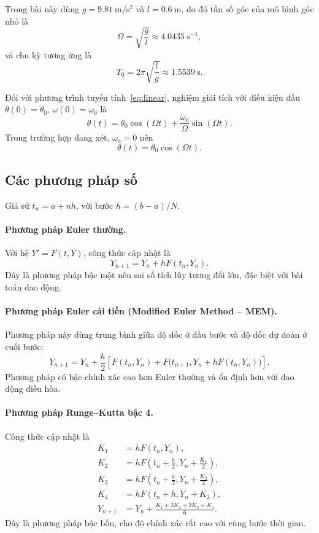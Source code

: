 \documentclass{article}
\begin{document}
Trong bài này dùng $g = 9.81\ \mathrm{m/s^2}$ và $l = 0.6\ \mathrm{m}$, do đó tần số góc của mô hình góc nhỏ là
\[
\Omega = \sqrt{\frac{g}{l}} \approx 4.0435\ \mathrm{s^{-1}},
\]
và chu kỳ tương ứng là
\[
T_0 = 2\pi\sqrt{\frac{l}{g}} \approx 1.5539\ \mathrm{s}.
\]

Đối với phương trình tuyến tính~\eqref{eq:linear}, nghiệm giải tích với điều kiện đầu $\theta(0)=\theta_0$, $\omega(0)=\omega_0$ là
\begin{equation}
\theta(t)=\theta_0\cos(\Omega t)+\frac{\omega_0}{\Omega}\sin(\Omega t).
\label{eq:exact_linear}
\end{equation}
Trong trường hợp đang xét, $\omega_0=0$ nên
\[
\theta(t)=\theta_0\cos(\Omega t).
\]

\subsection{Các phương pháp số}

Giả sử $t_n=a+nh$, với bước $h=(b-a)/N$.

\paragraph{Phương pháp Euler thường.}
Với hệ $Y'=F(t,Y)$, công thức cập nhật là
\begin{equation}
Y_{n+1}=Y_n+hF(t_n,Y_n).
\label{eq:euler}
\end{equation}
Đây là phương pháp bậc một nên sai số tích lũy tương đối lớn, đặc biệt với bài toán dao động.

\paragraph{Phương pháp Euler cải tiến (Modified Euler Method -- MEM).}
Phương pháp này dùng trung bình giữa độ dốc ở đầu bước và độ dốc dự đoán ở cuối bước:
\begin{equation}
Y_{n+1}=Y_n+\frac{h}{2}\left[F(t_n,Y_n)+F\bigl(t_{n+1},Y_n+hF(t_n,Y_n)\bigr)\right].
\label{eq:mem}
\end{equation}
Phương pháp có bậc chính xác cao hơn Euler thường và ổn định hơn với dao động điều hòa.

\paragraph{Phương pháp Runge--Kutta bậc 4.}
Công thức cập nhật là
\begin{align}
K_1 &= hF(t_n,Y_n),\nonumber\\
K_2 &= hF\left(t_n+\frac{h}{2},Y_n+\frac{K_1}{2}\right),\nonumber\\
K_3 &= hF\left(t_n+\frac{h}{2},Y_n+\frac{K_2}{2}\right),\nonumber\\
K_4 &= hF(t_n+h,Y_n+K_3),\nonumber\\
Y_{n+1} &= Y_n+\frac{K_1+2K_2+2K_3+K_4}{6}.
\label{eq:rk4}
\end{align}
Đây là phương pháp bậc bốn, cho độ chính xác rất cao với cùng bước thời gian.
\end{document}
